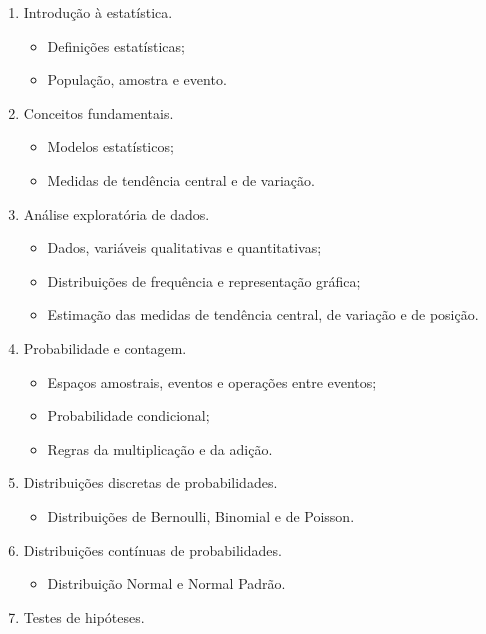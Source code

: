 \documentclass[
]{book}
\providecommand{\tightlist}{%
  \setlength{\itemsep}{0pt}\setlength{\parskip}{0pt}}
\begin{document}
\begin{enumerate}
\def\labelenumi{\arabic{enumi})}
\tightlist
\item
  Introdução à estatística.

  \begin{itemize}
  \tightlist
  \item
    Definições estatísticas;
  \item
    População, amostra e evento.
  \end{itemize}
\item
  Conceitos fundamentais.

  \begin{itemize}
  \tightlist
  \item
    Modelos estatísticos;
  \item
    Medidas de tendência central e de variação.
  \end{itemize}
\item
  Análise exploratória de dados.

  \begin{itemize}
  \tightlist
  \item
    Dados, variáveis qualitativas e quantitativas;
  \item
    Distribuições de frequência e representação gráfica;
  \item
    Estimação das medidas de tendência central, de variação e de posição.
  \end{itemize}
\item
  Probabilidade e contagem.

  \begin{itemize}
  \tightlist
  \item
    Espaços amostrais, eventos e operações entre eventos;
  \item
    Probabilidade condicional;
  \item
    Regras da multiplicação e da adição.
  \end{itemize}
\item
  Distribuições discretas de probabilidades.

  \begin{itemize}
  \tightlist
  \item
    Distribuições de Bernoulli, Binomial e de Poisson.
  \end{itemize}
\item
  Distribuições contínuas de probabilidades.

  \begin{itemize}
  \tightlist
  \item
    Distribuição Normal e Normal Padrão.
  \end{itemize}
\item
  Testes de hipóteses.


\end{enumerate}
\end{document}
